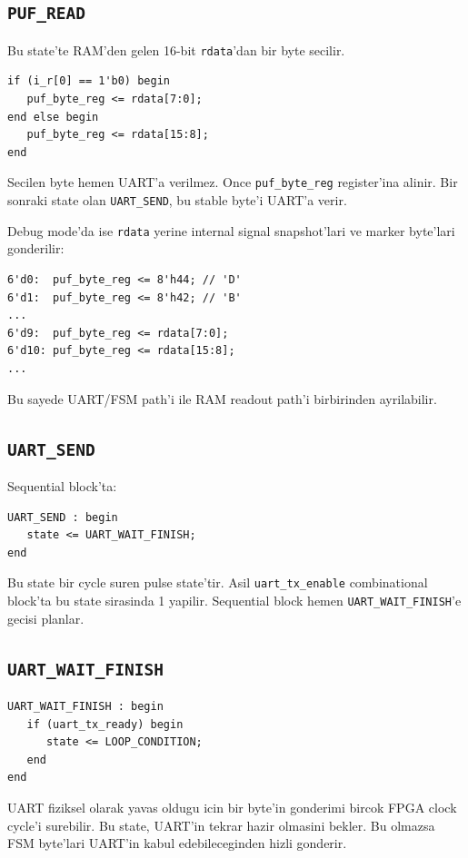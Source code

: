 \documentclass[11pt,a4paper]{article}
\begin{document}
\subsection{\texttt{PUF\_READ}}
Bu state'te RAM'den gelen 16-bit \texttt{rdata}'dan bir byte secilir.

\begin{lstlisting}[style=verilogstyle]
if (i_r[0] == 1'b0) begin
   puf_byte_reg <= rdata[7:0];
end else begin
   puf_byte_reg <= rdata[15:8];
end
\end{lstlisting}

Secilen byte hemen UART'a verilmez. Once \texttt{puf\_byte\_reg} register'ina alinir. Bir sonraki state olan \texttt{UART\_SEND}, bu stable byte'i UART'a verir.

Debug mode'da ise \texttt{rdata} yerine internal signal snapshot'lari ve marker byte'lari gonderilir:
\begin{lstlisting}[style=verilogstyle]
6'd0:  puf_byte_reg <= 8'h44; // 'D'
6'd1:  puf_byte_reg <= 8'h42; // 'B'
...
6'd9:  puf_byte_reg <= rdata[7:0];
6'd10: puf_byte_reg <= rdata[15:8];
...
\end{lstlisting}

Bu sayede UART/FSM path'i ile RAM readout path'i birbirinden ayrilabilir.

\subsection{\texttt{UART\_SEND}}
Sequential block'ta:
\begin{lstlisting}[style=verilogstyle]
UART_SEND : begin
   state <= UART_WAIT_FINISH;
end
\end{lstlisting}

Bu state bir cycle suren pulse state'tir. Asil \texttt{uart\_tx\_enable} combinational block'ta bu state sirasinda 1 yapilir. Sequential block hemen \texttt{UART\_WAIT\_FINISH}'e gecisi planlar.

\subsection{\texttt{UART\_WAIT\_FINISH}}
\begin{lstlisting}[style=verilogstyle]
UART_WAIT_FINISH : begin
   if (uart_tx_ready) begin
      state <= LOOP_CONDITION;
   end
end
\end{lstlisting}

UART fiziksel olarak yavas oldugu icin bir byte'in gonderimi bircok FPGA clock cycle'i surebilir. Bu state, UART'in tekrar hazir olmasini bekler. Bu olmazsa FSM byte'lari UART'in kabul edebileceginden hizli gonderir.
\end{document}
